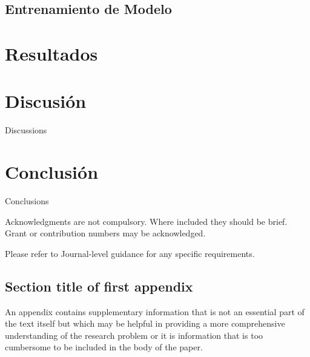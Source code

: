 \documentclass[sn-mathphys,Numbered]{sn-jnl}%
\theoremstyle{thmstyleone}%
\theoremstyle{thmstyletwo}%
\theoremstyle{thmstylethree}%
\begin{document}
\subsection{Entrenamiento de Modelo}\label{subsec6}

\section{Resultados}\label{sec4}


\section{Discusión}\label{sec5}

Discussions

\section{Conclusión}\label{sec6}

Conclusions





Acknowledgments are not compulsory. Where included they should be brief. Grant or contribution numbers may be acknowledged.

Please refer to Journal-level guidance for any specific requirements.



\begin{appendices}

\section{Section title of first appendix}\label{secA1}

An appendix contains supplementary information that is not an essential part of the text itself but which may be helpful in providing a more comprehensive understanding of the research problem or it is information that is too cumbersome to be included in the body of the paper.




\end{appendices}
\end{document}
